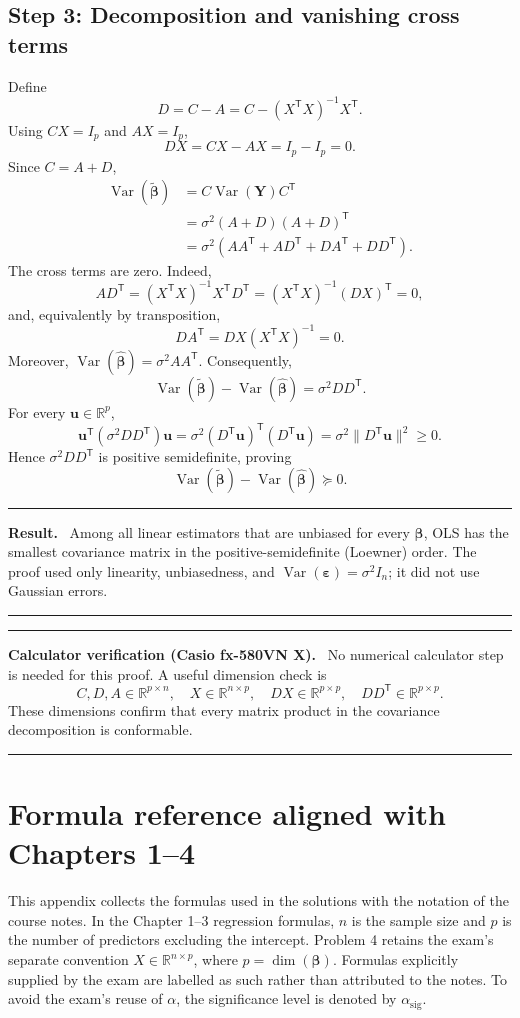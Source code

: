 \documentclass[11pt]{article}
\newcommand{\trans}{\mathsf T}
\newcommand{\Var}{\operatorname{Var}}
\newcommand{\R}{\mathbb{R}}
\newcommand{\answer}[1]{\boxed{\displaystyle #1}}
\newenvironment{resultbox}
  {\par\medskip\noindent\begin{minipage}{\linewidth}
   \color{navy!90!black}\hrule\medskip\textbf{Result.}\ }
  {\medskip\hrule\end{minipage}\par\medskip}
\newenvironment{checkbox}
  {\par\medskip\noindent\begin{minipage}{\linewidth}
   \color{navy!90!black}\hrule\medskip
   \textbf{\sffamily Calculator verification (Casio fx-580VN X).}\ }
  {\medskip\hrule\end{minipage}\par\medskip}
\begin{document}
\subsection{Step 3: Decomposition and vanishing cross terms}

Define
\[
D=C-A=C-(X^\trans X)^{-1}X^\trans.
\]
Using \(CX=I_p\) and \(AX=I_p\),
\[
DX=CX-AX=I_p-I_p=\answer{0}.
\]
Since \(C=A+D\),
\begin{align*}
\Var(\tilde{\bm\beta})
&=C\Var(\bm Y)C^\trans\\
&=\sigma^2(A+D)(A+D)^\trans\\
&=\sigma^2\left(AA^\trans+AD^\trans+DA^\trans+DD^\trans\right).
\end{align*}
The cross terms are zero. Indeed,
\[
AD^\trans=(X^\trans X)^{-1}X^\trans D^\trans
=(X^\trans X)^{-1}(DX)^\trans=0,
\]
and, equivalently by transposition,
\[
DA^\trans=DX(X^\trans X)^{-1}=0.
\]
Moreover, \(\Var(\hat{\bm\beta})=\sigma^2AA^\trans\). Consequently,
\[
\answer{
\Var(\tilde{\bm\beta})-\Var(\hat{\bm\beta})
=\sigma^2DD^\trans}.
\]
For every \(\bm u\in\R^p\),
\[
\bm u^\trans(\sigma^2DD^\trans)\bm u
=\sigma^2(D^\trans\bm u)^\trans(D^\trans\bm u)
=\sigma^2\lVert D^\trans\bm u\rVert^2\geq0.
\]
Hence \(\sigma^2DD^\trans\) is positive semidefinite, proving
\[
\boxed{
\Var(\tilde{\bm\beta})-\Var(\hat{\bm\beta})\succeq0}.
\]

\begin{resultbox}
Among all linear estimators that are unbiased for every \(\bm\beta\), OLS has
the smallest covariance matrix in the positive-semidefinite (Loewner) order.
The proof used only linearity, unbiasedness, and
\(\Var(\bm\varepsilon)=\sigma^2I_n\); it did not use Gaussian errors.
\end{resultbox}

\begin{checkbox}
No numerical calculator step is needed for this proof. A useful dimension
check is
\[
C,D,A\in\R^{p\times n},\quad X\in\R^{n\times p},\quad
DX\in\R^{p\times p},\quad DD^\trans\in\R^{p\times p}.
\]
These dimensions confirm that every matrix product in the covariance
decomposition is conformable.
\end{checkbox}

\clearpage
\appendix
\section{Formula reference aligned with Chapters 1--4}

This appendix collects the formulas used in the solutions with the notation of
the course notes. In the Chapter 1--3 regression formulas, \(n\) is the sample
size and \(p\) is the number of predictors excluding the intercept. Problem 4
retains the exam's separate convention \(X\in\mathbb R^{n\times p}\), where
\(p=\dim(\bm\beta)\). Formulas explicitly supplied by the exam are labelled as
such rather than attributed to the notes. To avoid the exam's reuse of
\(\alpha\), the significance level is denoted by \(\alpha_{\mathrm{sig}}\).
\end{document}

